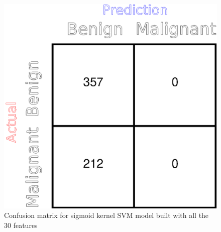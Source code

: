 \documentclass[twoside]{iitbreport}
\begin{document}
\begin{figure}[]
  \begin{center}
    \includegraphics[trim={9cm 0cm 0cm 0cm},clip,scale=0.8]{Figures/SVM_Sigmoid_CM}
  \end{center}
  \caption{Confusion matrix for sigmoid kernel SVM model built with all the 30 features}
  \label{SVMSigmoidCM}
\end{figure}
\end{document}
